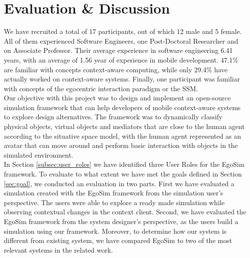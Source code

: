 \chapter{Evaluation \& Discussion}\label{ch:evaluation}
We have recruited a total of 17 participants, out of which 12 male and 5 female. All of them experienced Software Engineers, one Post-Doctoral Researcher and on Associate Professor. Their average experience in software engineering 6.41 years, with an average of 1.56 year of experience in mobile development. 47.1\% are familiar with concepts context-aware computing, while only 29.4\% have actually worked on context-aware systems. Finally, one participant was familiar with concepts of the egocentric interaction paradigm or the SSM.\\

Our objective with this project was to design and implement an open-source simulation framework that can help developers of mobile context-aware systems to explore design alternatives. The framework was to dynamically classify physical objects, virtual objects and mediators that are close to the human agent according to the situative space model, with the human agent represented as an avatar that can move around and perform basic interaction with objects in the simulated environment.\\

In Section \ref{subsec:user_roles} we have identified three User Roles for the EgoSim framework. To evaluate to what extent we have met the goals defined in Section \ref{sec:goal}, we conducted an evaluation in two parts. First we have evaluated a simulation created with the EgoSim framework from the simulation user's perspective. The users were able to explore a ready made simulation while observing contextual changes in the context client. Second, we have evaluated the EgoSim framework from the system designer's perspective, as the users build a simulation using our framework. Moreover, to determine how our system is different from existing system, we have compared EgoSim to two of the most relevant systems in the related work.\\





